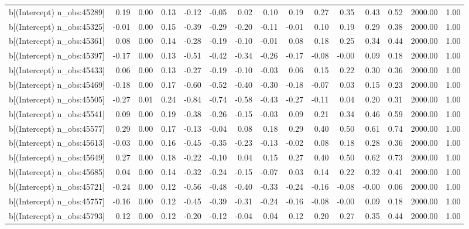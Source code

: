 \begin{table}[ht]
\begin{tabular}{rrrrrrrrrrrrrrr}
  b[(Intercept) n\_obs:45289] & 0.19 & 0.00 & 0.13 & -0.12 & -0.05 & 0.02 & 0.10 & 0.19 & 0.27 & 0.35 & 0.43 & 0.52 & 2000.00 & 1.00 \\ 
  b[(Intercept) n\_obs:45325] & -0.01 & 0.00 & 0.15 & -0.39 & -0.29 & -0.20 & -0.11 & -0.01 & 0.10 & 0.19 & 0.29 & 0.38 & 2000.00 & 1.00 \\ 
  b[(Intercept) n\_obs:45361] & 0.08 & 0.00 & 0.14 & -0.28 & -0.19 & -0.10 & -0.01 & 0.08 & 0.18 & 0.25 & 0.34 & 0.44 & 2000.00 & 1.00 \\ 
  b[(Intercept) n\_obs:45397] & -0.17 & 0.00 & 0.13 & -0.51 & -0.42 & -0.34 & -0.26 & -0.17 & -0.08 & -0.00 & 0.09 & 0.18 & 2000.00 & 1.00 \\ 
  b[(Intercept) n\_obs:45433] & 0.06 & 0.00 & 0.13 & -0.27 & -0.19 & -0.10 & -0.03 & 0.06 & 0.15 & 0.22 & 0.30 & 0.36 & 2000.00 & 1.00 \\ 
  b[(Intercept) n\_obs:45469] & -0.18 & 0.00 & 0.17 & -0.60 & -0.52 & -0.40 & -0.30 & -0.18 & -0.07 & 0.03 & 0.15 & 0.23 & 2000.00 & 1.00 \\ 
  b[(Intercept) n\_obs:45505] & -0.27 & 0.01 & 0.24 & -0.84 & -0.74 & -0.58 & -0.43 & -0.27 & -0.11 & 0.04 & 0.20 & 0.31 & 2000.00 & 1.00 \\ 
  b[(Intercept) n\_obs:45541] & 0.09 & 0.00 & 0.19 & -0.38 & -0.26 & -0.15 & -0.03 & 0.09 & 0.21 & 0.34 & 0.46 & 0.59 & 2000.00 & 1.00 \\ 
  b[(Intercept) n\_obs:45577] & 0.29 & 0.00 & 0.17 & -0.13 & -0.04 & 0.08 & 0.18 & 0.29 & 0.40 & 0.50 & 0.61 & 0.74 & 2000.00 & 1.00 \\ 
  b[(Intercept) n\_obs:45613] & -0.03 & 0.00 & 0.16 & -0.45 & -0.35 & -0.23 & -0.13 & -0.02 & 0.08 & 0.18 & 0.28 & 0.36 & 2000.00 & 1.00 \\ 
  b[(Intercept) n\_obs:45649] & 0.27 & 0.00 & 0.18 & -0.22 & -0.10 & 0.04 & 0.15 & 0.27 & 0.40 & 0.50 & 0.62 & 0.73 & 2000.00 & 1.00 \\ 
  b[(Intercept) n\_obs:45685] & 0.04 & 0.00 & 0.14 & -0.32 & -0.24 & -0.15 & -0.07 & 0.03 & 0.14 & 0.22 & 0.32 & 0.41 & 2000.00 & 1.00 \\ 
  b[(Intercept) n\_obs:45721] & -0.24 & 0.00 & 0.12 & -0.56 & -0.48 & -0.40 & -0.33 & -0.24 & -0.16 & -0.08 & -0.00 & 0.06 & 2000.00 & 1.00 \\ 
  b[(Intercept) n\_obs:45757] & -0.16 & 0.00 & 0.12 & -0.45 & -0.39 & -0.31 & -0.24 & -0.16 & -0.08 & -0.00 & 0.09 & 0.18 & 2000.00 & 1.00 \\ 
  b[(Intercept) n\_obs:45793] & 0.12 & 0.00 & 0.12 & -0.20 & -0.12 & -0.04 & 0.04 & 0.12 & 0.20 & 0.27 & 0.35 & 0.44 & 2000.00 & 1.00 \\ 

\end{tabular}
\end{table}
